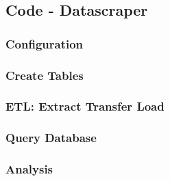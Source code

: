 \subsection{Code - Datascraper}
\subsubsection{Configuration}


\subsubsection{Create Tables}






\subsubsection{ETL: Extract Transfer Load}





\subsubsection{Query Database}





\subsubsection{Analysis}



